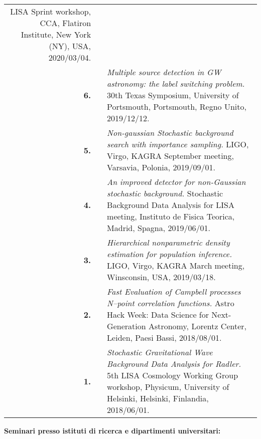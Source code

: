 {\begin{longtable}{rp{0.3cm}p{15.8cm}}
\newline{}
LISA Sprint workshop, CCA, Flatiron Institute, New York (NY), USA, 2020/03/04.
\vspace{0.05cm}\\
%
\textbf{6.} &  & \textit{Multiple source detection in GW astronomy: the label switching problem.}
\newline{}
30th Texas Symposium, University of Portsmouth, Portsmouth, Regno Unito, 2019/12/12.
\vspace{0.05cm}\\
%
\textbf{5.} &  & \textit{Non-gaussian Stochastic background search with importance sampling.}
\newline{}
LIGO, Virgo, KAGRA September meeting, Varsavia, Polonia, 2019/09/01.
\vspace{0.05cm}\\
%
\textbf{4.} &  & \textit{An improved detector for non-Gaussian stochastic background.}
\newline{}
Stochastic Background Data Analysis for LISA meeting, Instituto de Fisica Teorica, Madrid, Spagna, 2019/06/01.
\vspace{0.05cm}\\
%
\textbf{3.} &  & \textit{Hierarchical nonparametric density estimation for population inference.}
\newline{}
LIGO, Virgo, KAGRA March meeting, Winsconsin, USA, 2019/03/18.
\vspace{0.05cm}\\
%
\textbf{2.} &  & \textit{Fast Evaluation of Campbell processes N–point correlation functions.}
\newline{}
Astro Hack Week: Data Science for Next-Generation Astronomy, Lorentz Center, Leiden, Paesi Bassi, 2018/08/01.
\vspace{0.05cm}\\
%
\textbf{1.} &  & \textit{Stochastic Gravitational Wave Background Data Analysis for Radler.}
\newline{}
5th LISA Cosmology Working Group workshop, Physicum, University of Helsinki, Helsinki, Finlandia, 2018/06/01.
\vspace{0.05cm}\\
%
\end{longtable} }
\textcolor{color1}{\textbf{Seminari presso istituti di ricerca e dipartimenti universitari:}}
\vspace{-0.5cm}

